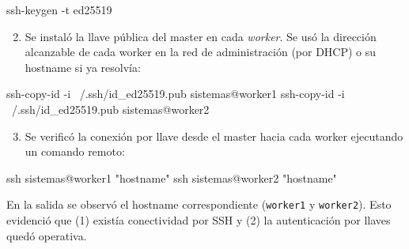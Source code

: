 \begin{terminalblock}
ssh-keygen -t ed25519
\end{terminalblock}


\begin{enumerate}
  \setcounter{enumi}{1}
  \item Se instaló la llave pública del master en cada \textit{worker}. Se usó la dirección alcanzable de cada worker en la red de administración (por DHCP) o su hostname si ya resolvía:
\end{enumerate}

\begin{terminalblock}
ssh-copy-id -i ~/.ssh/id_ed25519.pub sistemas@worker1
ssh-copy-id -i ~/.ssh/id_ed25519.pub sistemas@worker2
\end{terminalblock}


\begin{enumerate}
  \setcounter{enumi}{2}
  \item Se verificó la conexión por llave desde el master hacia cada worker ejecutando un comando remoto:
\end{enumerate}

\begin{terminalblock}
ssh sistemas@worker1 "hostname"
ssh sistemas@worker2 "hostname"
\end{terminalblock}

En la salida se observó el hostname correspondiente (\texttt{worker1} y \texttt{worker2}). Esto evidenció que (1) existía conectividad por SSH y (2) la autenticación por llaves quedó operativa.



